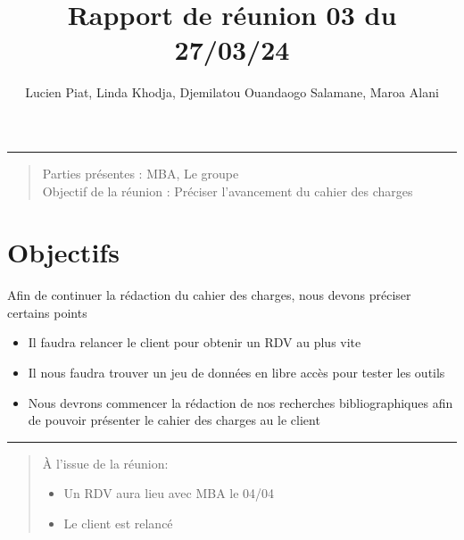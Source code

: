 \documentclass[a4paper, 11pt]{article}
\title{Rapport de réunion 03 du 27/03/24}
\author{Lucien Piat, Linda Khodja, Djemilatou Ouandaogo Salamane, Maroa Alani}
\begin{document}
\maketitle
\noindent\rule{8cm}{0.4pt}
\begin{quote}
    Parties présentes : MBA, Le groupe\\
    Objectif de la réunion : Préciser l'avancement du cahier des charges
\end{quote}

\section{Objectifs}
Afin de continuer la rédaction du cahier des charges, nous devons préciser certains points
\begin{itemize}
    \item Il faudra relancer le client pour obtenir un RDV au plus vite
    \item Il nous faudra trouver un jeu de données en libre accès pour tester les outils
    \item Nous devrons commencer la rédaction de nos recherches bibliographiques afin de pouvoir présenter le cahier des charges au le client 
\end{itemize}


\noindent\rule{8cm}{0.4pt}
\begin{quotation}
    À l'issue de la réunion: \begin{itemize}
        \item Un RDV aura lieu avec MBA le 04/04
        \item Le client est relancé 
    \end{itemize} 
\end{quotation}
\end{document}
